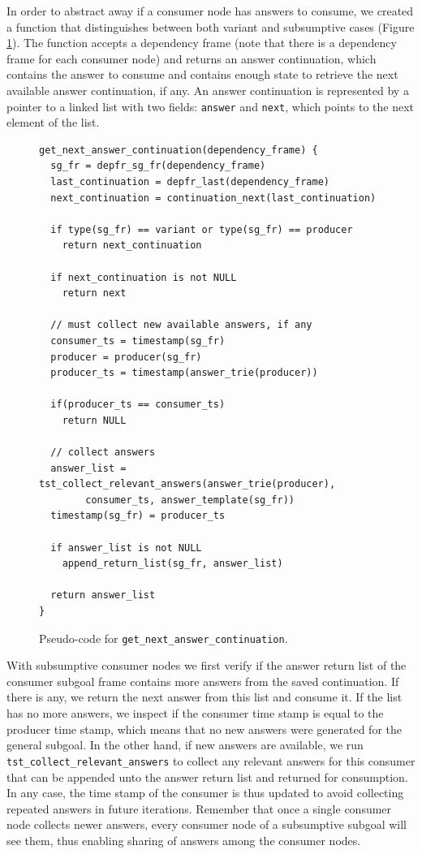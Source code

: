 In order to abstract away if a consumer node has answers to consume,
we created a function that distinguishes between both variant and subsumptive cases
(Figure \ref{fig:get_next_answer_continuation}).
The function accepts a dependency frame (note that there is a dependency frame for
each consumer node) and returns an answer continuation, which contains the answer
to consume and contains enough state to retrieve the next available answer continuation, if any.
An answer continuation is represented by a pointer to a linked list with two fields:
\texttt{answer} and \texttt{next}, which points to the next element of the list.

\begin{figure}[ht]
\begin{Verbatim}
get_next_answer_continuation(dependency_frame) {
  sg_fr = depfr_sg_fr(dependency_frame)
  last_continuation = depfr_last(dependency_frame)
  next_continuation = continuation_next(last_continuation)
  
  if type(sg_fr) == variant or type(sg_fr) == producer
    return next_continuation
  
  if next_continuation is not NULL
    return next
  
  // must collect new available answers, if any
  consumer_ts = timestamp(sg_fr)
  producer = producer(sg_fr)
  producer_ts = timestamp(answer_trie(producer))
      
  if(producer_ts == consumer_ts)
    return NULL
        
  // collect answers
  answer_list = tst_collect_relevant_answers(answer_trie(producer),
        consumer_ts, answer_template(sg_fr))
  timestamp(sg_fr) = producer_ts
      
  if answer_list is not NULL
    append_return_list(sg_fr, answer_list)
      
  return answer_list
}
\end{Verbatim}
\caption{Pseudo-code for \texttt{get\_next\_answer\_continuation}.}
\label{fig:get_next_answer_continuation}
\end{figure}

With subsumptive consumer nodes we first verify if the answer return list of the
consumer subgoal frame contains more answers from the saved continuation. If there is
any, we return the next answer from this list and consume it. If the list has no more answers,
we inspect if the consumer time stamp is equal to the producer time stamp, which means
that no new answers were generated for the general subgoal. In the other hand, if new
answers are available, we run \texttt{tst\_collect\_relevant\_answers} to collect any
relevant answers for this consumer that can be appended unto the answer return list
and returned for consumption.
In any case, the time stamp of the consumer is thus updated to avoid collecting
repeated answers in future iterations. Remember that once a single consumer node
collects newer answers, every consumer node of a subsumptive subgoal will see them, thus
enabling sharing of answers among the consumer nodes.

